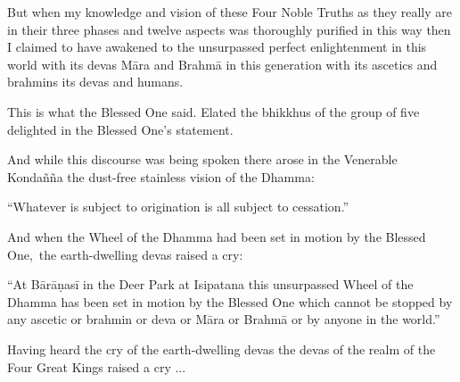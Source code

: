 \medskip

\begin{english-hang}
  But when my knowledge and vision of these Four Noble Truths as they really are in their three phases and twelve aspects was thoroughly purified in this way then I claimed to have awakened to the unsurpassed perfect enlightenment in this world with its devas Māra and Brahmā in this generation with its ascetics and brahmins its devas and humans.
\end{english-hang}

\medskip

\begin{english-hang}
  This is what the Blessed One said. Elated the bhikkhus of the group of five delighted in the Blessed One's statement.
\end{english-hang}

\medskip

\begin{english-hang}
  And while this discourse was being spoken there arose in the Venerable Kondañña the dust-free stainless vision of the Dhamma:
\end{english-hang}

\medskip

\begin{english-hang}
  ``Whatever is subject to origination is all subject to cessation.''
\end{english-hang}

\medskip

\begin{english-hang}
  And when the Wheel of the Dhamma had been set in motion by the Blessed One, the earth-dwelling devas raised a cry:
\end{english-hang}

\medskip

\begin{english-hang}
  ``At Bārāṇasī in the Deer Park at Isipatana this unsurpassed Wheel of the Dhamma has been set in motion by the Blessed One which cannot be stopped by any ascetic or brahmin or deva or Māra or Brahmā or by anyone in the world.''
\end{english-hang}

\medskip

\begin{english-hang}
  Having heard the cry of the earth-dwelling devas the devas of the realm of the Four Great Kings raised a cry ...
\end{english-hang}

